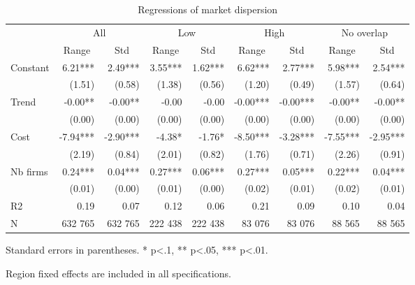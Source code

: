 \documentclass[english]{article}
\begin{document}
\begin{table}[H]
\caption{Regressions of market dispersion}
\label{tab:regs_market_dispersion_all}
\begin{threeparttable}
    \begin{tabular}{lrrrrrrrr}
    \toprule
    \toprule
          & \multicolumn{2}{c}{All} & \multicolumn{2}{c}{Low} & \multicolumn{2}{c}{High} & \multicolumn{2}{c}{No overlap} \\
          & \multicolumn{1}{c}{Range} & \multicolumn{1}{c}{Std} & \multicolumn{1}{c}{Range} & \multicolumn{1}{c}{Std} & \multicolumn{1}{c}{Range} & \multicolumn{1}{c}{Std} & \multicolumn{1}{c}{Range} & \multicolumn{1}{c}{Std} \\
    \midrule
    Constant & 6.21*** & 2.49*** & 3.55*** & 1.62*** & 6.62*** & 2.77*** & 5.98*** & 2.54*** \\
          & (1.51) & (0.58) & (1.38) & (0.56) & (1.20) & (0.49) & (1.57) & (0.64) \\
    Trend & -0.00** & -0.00** & -0.00 & -0.00 & -0.00*** & -0.00*** & -0.00** & -0.00** \\
          & (0.00) & (0.00) & (0.00) & (0.00) & (0.00) & (0.00) & (0.00) & (0.00) \\
    Cost  & -7.94*** & -2.90*** & -4.38* & -1.76* & -8.50*** & -3.28*** & -7.55*** & -2.95*** \\
          & (2.19) & (0.84) & (2.01) & (0.82) & (1.76) & (0.71) & (2.26) & (0.91) \\
    Nb firms & 0.24*** & 0.04*** & 0.27*** & 0.06*** & 0.27*** & 0.05*** & 0.22*** & 0.04*** \\
          & (0.01) & (0.00) & (0.01) & (0.00) & (0.02) & (0.01) & (0.02) & (0.01) \\
    \midrule
    R2    & 0.19  & 0.07  & 0.12  & 0.06  & 0.21  & 0.09  & 0.10  & 0.04 \\
    N     & 632 765 & 632 765 & 222 438 & 222 438 & 83 076 & 83 076 & 88 565 & 88 565 \\
\bottomrule
\bottomrule
\end{tabular}
\begin{tablenotes}
      \small
      \item Standard errors in parentheses. * p<.1, ** p<.05, *** p<.01.
      \item Region fixed effects are included in all specifications.
\end{tablenotes}
\end{threeparttable}
\end{table}
\end{document}
